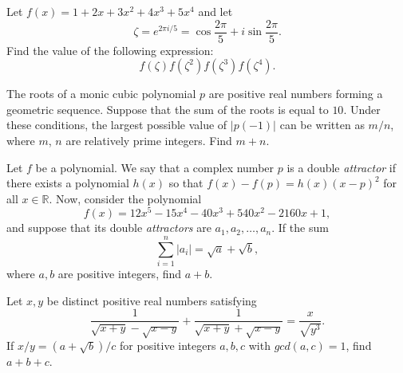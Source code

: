 \begin{question}[name={2021 PUMaC, Algebra, \href{https://artofproblemsolving.com/community/c4p25094239}{Problem A3/B5}}]
	Let $f(x) = 1 + 2x + 3x^2 + 4x^3 + 5x^4$ and let $$\zeta = e^{2\pi i/5} = \cos \frac{2\pi}{5} + i \sin \frac{2\pi}{5}.$$ Find the value of the following expression: $$f(\zeta)f(\zeta^2)f(\zeta^3)f(\zeta^4).$$
\end{question}









\begin{question}[name={2021 PUMaC, Algebra, \href{https://artofproblemsolving.com/community/c4p25094253}{Problem A4/B6}}]
	The roots of a monic cubic polynomial $p$ are positive real numbers forming a geometric sequence. Suppose that the sum of the roots is equal to $10$. Under these conditions, the largest possible value of $|p(-1)|$ can be written as ${m}/{n}$, where $m$, $n$ are relatively prime integers. Find $m + n$.	
\end{question}






\begin{question}[name={2021 PUMaC, Algebra, \href{https://artofproblemsolving.com/community/c4p25094307}{Problem A6/B8}}]
	Let $f$ be a polynomial. We say that a complex number $p$ is a double \textit{attractor} if there exists a polynomial $h(x)$ so that $f(x)-f(p) = h(x)(x-p)^2$ for all $x \in \mathbb R$. Now, consider the polynomial $$f(x) = 12x^5 - 15x^4 - 40x^3 + 540x^2 - 2160x + 1,$$ and suppose that its double \textit{attractors} are $a_1, a_2,\dots, a_n$. If the sum $$\sum^{n}_{i=1}|a_i| = \sqrt{a} +\sqrt{b},$$ where $a, b$ are positive integers, find $a + b$.
\end{question}












\begin{question}[name={2021 PUMaC, Algebra, \href{https://artofproblemsolving.com/community/c4p25094482}{Problem B1}}]
	Let $x, y$ be distinct positive real numbers satisfying
	$$\frac{1}{\sqrt{x + y} -\sqrt{x - y}}+\frac{1}{\sqrt{x + y} +\sqrt{x - y}} =\frac{x}{\sqrt{y^3}}.$$
	If ${x}/{y} =({a+\sqrt{b}})/{c}$ for positive integers $a, b, c$ with $gcd (a, c) = 1$, find $a + b + c$.
\end{question}








